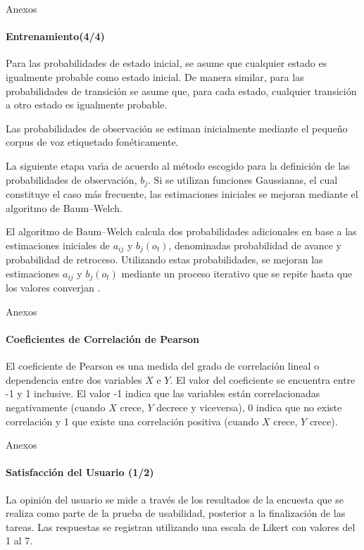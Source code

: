 \begin{frame}{Anexos}
\framesubtitle{Entrenamiento(4/4)}

Para las probabilidades de estado inicial, se asume que cualquier estado es igualmente probable 
como estado inicial. De manera similar, para las probabilidades de transici\'on se asume que, para cada estado, cualquier transici\'on a otro estado es igualmente probable.

Las probabilidades de observaci\'on se estiman inicialmente mediante el peque\~no corpus 
de voz etiquetado fon\'eticamente.

La siguiente etapa var{\'\i}a de acuerdo al m\'etodo escogido para la definici\'on de las probabilidades
de observaci\'on, $b_j$. Si se utilizan funciones Gaussianas, el cual constituye el caso m\'as
frecuente, las estimaciones iniciales se mejoran mediante el algoritmo de Baum--Welch.

El algoritmo de Baum--Welch calcula dos probabilidades adicionales en base a las estimaciones
iniciales de $a_{ij}$ y $b_j(o_t)$, denominadas probabilidad de avance y probabilidad de retroceso. 
Utilizando estas probabilidades, se mejoran las estimaciones $a_{ij}$ y $b_j(o_t)$ mediante
un proceso iterativo que se repite hasta que los valores converjan \cite{Rabiner89atutorial}.
\end{frame}

\begin{frame}{Anexos}
\framesubtitle{Coeficientes de Correlaci\'on de Pearson}
El coeficiente de Pearson es una medida del grado de correlaci\'on lineal o dependencia entre dos 
variables $X$ e $Y$. El valor del coeficiente se encuentra entre -1 y 1 inclusive. 
El valor -1 indica que las variables est\'an correlacionadas negativamente 
(cuando $X$ crece, $Y$ decrece y viceversa), 0 indica que no existe correlaci\'on y 1 que existe una 
correlaci\'on positiva (cuando $X$ crece, $Y$ crece).
\end{frame}

\begin{frame}{Anexos}
\framesubtitle{Satisfacci\'on del Usuario (1/2)}
La opini\'on del usuario se mide a trav\'es de los resultados de la encuesta que se realiza como parte de
la prueba de usabilidad, posterior a la finalizaci\'on de las tareas. Las respuestas se
registran utilizando una escala de Likert con valores del 1 al 7.
\end{frame}

